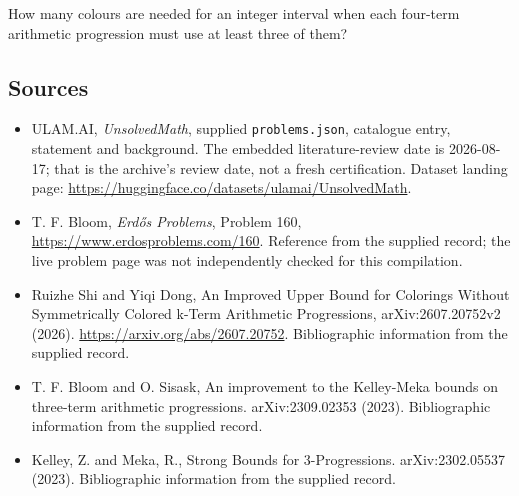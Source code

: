\documentclass[11pt,a4paper]{article}
\begin{document}
How many colours are needed for an integer interval when each four-term arithmetic progression must use at least three of them?

\subsection{Sources}

{\small

\begin{itemize}

\item[\hypertarget{source:statement:1}{S1}] ULAM.AI, \emph{UnsolvedMath}, supplied \texttt{problems.json}, catalogue entry, statement and background. The embedded literature-review date is 2026-08-17; that is the archive’s review date, not a fresh certification. Dataset landing page: \url{https://huggingface.co/datasets/ulamai/UnsolvedMath}.

\item[\hypertarget{source:statement:2}{S2}] T. F. Bloom, \emph{Erdős Problems}, Problem 160, \url{https://www.erdosproblems.com/160}. Reference from the supplied record; the live problem page was not independently checked for this compilation.

\item[\hypertarget{source:statement:3}{S3}] Ruizhe Shi and Yiqi Dong, An Improved Upper Bound for Colorings Without Symmetrically Colored k-Term Arithmetic Progressions, arXiv:2607.20752v2 (2026). \url{https://arxiv.org/abs/2607.20752}. Bibliographic information from the supplied record.

\item[\hypertarget{source:statement:4}{S4}] T. F. Bloom and O. Sisask, An improvement to the Kelley-Meka bounds on three-term arithmetic progressions. arXiv:2309.02353 (2023). Bibliographic information from the supplied record.

\item[\hypertarget{source:statement:5}{S5}] Kelley, Z. and Meka, R., Strong Bounds for 3-Progressions. arXiv:2302.05537 (2023). Bibliographic information from the supplied record.

\end{itemize}

}

\label{end:statement}
\end{document}
